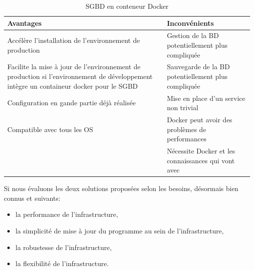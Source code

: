 \documentclass[
    iai, %
    il, %
]{heig-tb}
\begin{document}
\begin{table}[h]
    \begin{center}
        \caption{SGBD en conteneur Docker \label{prod-db-docker}}
        \begin{tabularx}{1.0\textwidth} {X|X}
            Avantages                                                & Inconvénients                                                        \\ \hline
            Accélère l'installation de l'environnement de production & Gestion de la BD
            potentiellement plus compliquée                                                                                                 \\
            Facilite la mise à jour de l'environnement de production si l'environnement de
            développement intègre un containeur docker pour le SGBD  & Sauvegarde de la BD
            potentiellement plus compliquée                                                                                                 \\
            Configuration en gande partie déjà réalisée              & Mise en place d'un service non trivial                               \\
            Compatible avec tous les OS                              & Docker peut avoir des problèmes de performances
            \cite{labrecque}                                                                                                                \\
                                                                     & Nécessite Docker et les connaissances qui vont avec \cite{labrecque} \\
        \end{tabularx}
    \end{center}
\end{table}

Si nous évaluons les deux solutions proposées selon les besoins, désormais bien connus et suivants:
\begin{itemize}
    \item la performance de l'infrastructure,
    \item la simplicité de mise à jour du programme au sein de l'infrastructure,
    \item la robustesse de l'infrastructure,
    \item la flexibilité de l'infrastructure.
\end{itemize}
\end{document}
